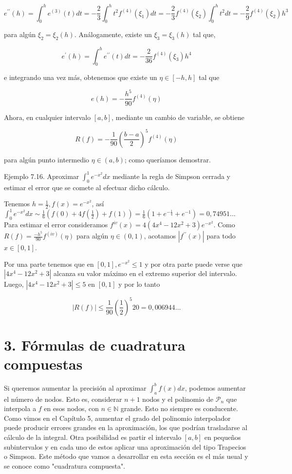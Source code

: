 \documentclass[10pt]{article}
\begin{document}
$$
e^{\prime \prime}(h)=\int_{0}^{h} e^{(3)}(t) d t=-\frac{2}{3} \int_{0}^{h} t^{2} f^{(4)}\left(\xi_{1}\right) d t=-\frac{2}{3} f^{(4)}\left(\xi_{2}\right) \int_{0}^{h} t^{2} d t=-\frac{2}{9} f^{(4)}\left(\xi_{2}\right) h^{3}
$$

para algún $\xi_{2}=\xi_{2}(h)$. Análogamente, existe un $\xi_{3}=\xi_{3}(h)$ tal que,

$$
e^{\prime}(h)=\int_{0}^{h} e^{\prime \prime}(t) d t=-\frac{2}{36} f^{(4)}\left(\xi_{3}\right) h^{4}
$$

e integrando una vez más, obtenemos que existe un $\eta \in[-h, h]$ tal que

$$
e(h)=-\frac{h^{5}}{90} f^{(4)}(\eta)
$$

Ahora, en cualquier intervalo $[a, b]$, mediante un cambio de variable, se obtiene

$$
R(f)=-\frac{1}{90}\left(\frac{b-a}{2}\right)^{5} f^{(4)}(\eta)
$$

para algún punto intermedio $\eta \in(a, b)$; como queríamos demostrar.

Ejemplo 7.16. Aproximar $\int_{0}^{1} e^{-x^{2}} d x$ mediante la regla de Simpson cerrada y estimar el error que se comete al efectuar dicho cálculo.

Tenemos $h=\frac{1}{2}, f(x)=e^{-x^{2}}$, así\\
$\int_{0}^{1} e^{-x^{2}} d x \sim \frac{1}{6}\left(f(0)+4 f\left(\frac{1}{2}\right)+f(1)\right)=\frac{1}{6}\left(1+e^{-\frac{1}{4}}+e^{-1}\right)=0,74951 \ldots$\\
Para estimar el error consideramos $f^{i v}(x)=4\left(4 x^{4}-12 x^{2}+3\right) e^{-x^{2}}$. Como $R(f)=\frac{-h^{5}}{90} f^{(i v)}(\eta)$ para algún $\eta \in(0,1)$, acotamos $\left|f^{\prime \prime}(x)\right|$ para todo $x \in[0,1]$.

Por una parte tenemos que en $[0,1], e^{-x^{2}} \leq 1$ y por otra parte puede verse que $\left|4 x^{4}-12 x^{2}+3\right|$ alcanza su valor máximo en el extremo superior del intervalo. Luego, $\left|4 x^{4}-12 x^{2}+3\right| \leq 5$ en $[0,1]$ y por lo tanto

$$
|R(f)| \leq \frac{1}{90}\left(\frac{1}{2}\right)^{5} 20=0,006944 \ldots
$$

\section*{3. Fórmulas de cuadratura compuestas}
Si queremos aumentar la precisión al aproximar $\int_{a}^{b} f(x) d x$, podemos aumentar el número de nodos. Esto es, considerar $n+1$ nodos y el polinomio de $\mathcal{P}_{n}$ que interpola a $f$ en esos nodos, con $n \in \mathbb{N}$ grande. Esto no siempre es conducente. Como vimos en el Capítulo 5, aumentar el grado del polinomio interpolador puede producir errores grandes en la aproximación, los que podrían trasladarse al cálculo de la integral. Otra posibilidad es partir el intervalo $[a, b]$ en pequeños subintervalos y en cada uno de estos aplicar una aproximación del tipo Trapecios o Simpson. Este método que vamos a desarrollar en esta sección es el más usual y se conoce como "cuadratura compuesta".
\end{document}
